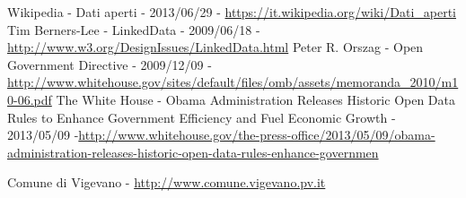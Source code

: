 \begin{thebibliography}{100}

  Wikipedia - Dati aperti - 2013/06/29 - \url{https://it.wikipedia.org/wiki/Dati_aperti}
 Tim Berners-Lee - LinkedData - 2009/06/18 - \url{http://www.w3.org/DesignIssues/LinkedData.html}
 Peter R. Orszag - Open Government Directive - 2009/12/09 -\url{http://www.whitehouse.gov/sites/default/files/omb/assets/memoranda_2010/m10-06.pdf}
 The White House - Obama Administration Releases Historic Open Data Rules to Enhance Government Efficiency and Fuel Economic Growth - 2013/05/09 -\url{http://www.whitehouse.gov/the-press-office/2013/05/09/obama-administration-releases-historic-open-data-rules-enhance-governmen}

 Comune di Vigevano - \url{http://www.comune.vigevano.pv.it}


\end{thebibliography} 